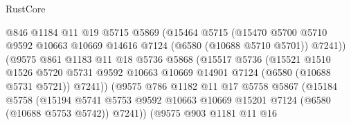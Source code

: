 \begin{lexlean}{RustCore}
\begin{coremodule}
                              @846
                              @1184
                              @11
                              @19
                              @5715
                              @5869
                              (@15464
                                @5715
                                (@15470
                                  @5700
                                  @5710
                                  @9592
                                  @10663
                                  @10669
                                  @14616
                                  @7124
                                  (@6580 (@10688 @5710 @5701))
                                  @7241))
                              (@9575
                                @861
                                @1183
                                @11
                                @18
                                @5736
                                @5868
                                (@15517
                                  @5736
                                  (@15521
                                    @1510
                                    @1526
                                    @5720
                                    @5731
                                    @9592
                                    @10663
                                    @10669
                                    @14901
                                    @7124
                                    (@6580 (@10688 @5731 @5721))
                                    @7241))
                                (@9575
                                  @786
                                  @1182
                                  @11
                                  @17
                                  @5758
                                  @5867
                                  (@15184
                                    @5758
                                    (@15194
                                      @5741
                                      @5753
                                      @9592
                                      @10663
                                      @10669
                                      @15201
                                      @7124
                                      (@6580 (@10688 @5753 @5742))
                                      @7241))
                                  (@9575
                                    @903
                                    @1181
                                    @11
                                    @16

\end{coremodule}
\end{lexlean}
